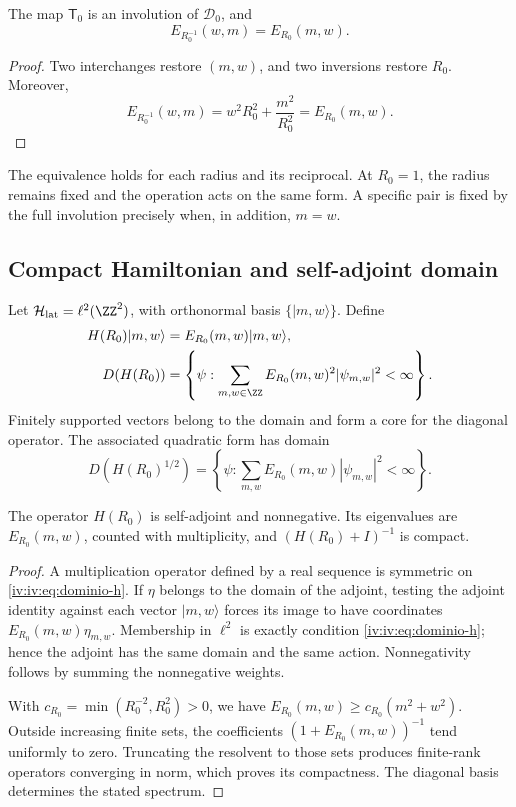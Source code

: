 \begin{theorem}
\label{iv:iv:thm:dualidad-escalar}
The map \(\mathsf T_0\) is an involution of
\(\mathscr D_0\), and
\[
 E_{R_0^{-1}}(w,m)=E_{R_0}(m,w).
\]
\end{theorem}
\begin{proof}
Two interchanges restore \((m,w)\), and two inversions restore
\(R_0\). Moreover,
\[
 E_{R_0^{-1}}(w,m)=w^2R_0^2+\frac{m^2}{R_0^2}
 =E_{R_0}(m,w).
\]
\end{proof}

The equivalence holds for each radius and its reciprocal. At \(R_0=1\),
the radius remains fixed and the operation acts on the same form.
A specific pair is fixed by the full involution precisely
when, in addition, \(m=w\).

\subsection{Compact Hamiltonian and self-adjoint domain}

Let \(\mathcal H_{\mathrm{lat}}=\ell^2(\ZZ^2)\), with
orthonormal basis \(\{|m,w\rangle\}\). Define
\begin{align}
 H(R_0)|m,w\rangle&=E_{R_0}(m,w)|m,w\rangle,\label{iv:iv:eq:hamiltoniano}\\
 D(H(R_0))&=\left\{\psi:\sum_{m,w\in\ZZ}
 E_{R_0}(m,w)^2|\psi_{m,w}|^2<\infty\right\}.\label{iv:iv:eq:dominio-h}
\end{align}
Finitely supported vectors belong to the domain and form a
core for the diagonal operator. The associated quadratic form has
domain
\[
 D(H(R_0)^{1/2})=\left\{\psi:\sum_{m,w}
 E_{R_0}(m,w)|\psi_{m,w}|^2<\infty\right\}.
\]

\begin{proposition}
\label{iv:iv:prop:h-autoadjunto}
The operator \(H(R_0)\) is self-adjoint and nonnegative. Its
eigenvalues are \(E_{R_0}(m,w)\), counted with multiplicity,
and \((H(R_0)+I)^{-1}\) is compact.
\end{proposition}
\begin{proof}
A multiplication operator defined by a real sequence is symmetric
on \eqref{iv:iv:eq:dominio-h}. If \(\eta\) belongs to the domain
of the adjoint, testing the adjoint identity against each vector
\(|m,w\rangle\) forces its image to have coordinates
\(E_{R_0}(m,w)\eta_{m,w}\). Membership in
\(\ell^2\) is exactly condition \eqref{iv:iv:eq:dominio-h}; hence
the adjoint has the same domain and the same action. Nonnegativity
follows by summing the nonnegative weights.

With \(c_{R_0}=\min(R_0^{-2},R_0^2)>0\), we have
\(E_{R_0}(m,w)\geq c_{R_0}(m^2+w^2)\). Outside increasing
finite sets, the coefficients
\((1+E_{R_0}(m,w))^{-1}\) tend uniformly to zero.
Truncating the resolvent to those sets produces finite-rank
operators converging in norm, which proves its
compactness. The diagonal basis determines the stated spectrum.
\end{proof}

